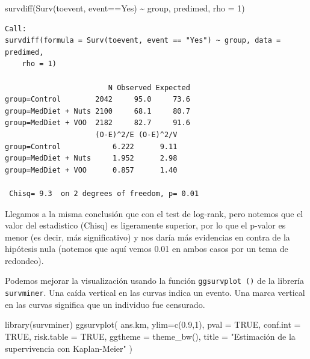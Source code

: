 \documentclass[
]{book}
\newenvironment{Shaded}{\begin{snugshade}}{\end{snugshade}}
\newcommand{\AttributeTok}[1]{\textcolor[rgb]{0.77,0.63,0.00}{#1}}
\newcommand{\ConstantTok}[1]{\textcolor[rgb]{0.00,0.00,0.00}{#1}}
\newcommand{\DecValTok}[1]{\textcolor[rgb]{0.00,0.00,0.81}{#1}}
\newcommand{\FloatTok}[1]{\textcolor[rgb]{0.00,0.00,0.81}{#1}}
\newcommand{\FunctionTok}[1]{\textcolor[rgb]{0.00,0.00,0.00}{#1}}
\newcommand{\NormalTok}[1]{#1}
\newcommand{\SpecialCharTok}[1]{\textcolor[rgb]{0.00,0.00,0.00}{#1}}
\newcommand{\StringTok}[1]{\textcolor[rgb]{0.31,0.60,0.02}{#1}}
\begin{document}
\begin{Shaded}
\begin{Highlighting}[]
\FunctionTok{survdiff}\NormalTok{(}\FunctionTok{Surv}\NormalTok{(toevent, event}\SpecialCharTok{==}\StringTok{\textquotesingle{}Yes\textquotesingle{}}\NormalTok{) }\SpecialCharTok{\textasciitilde{}}\NormalTok{ group, predimed, }\AttributeTok{rho =} \DecValTok{1}\NormalTok{)}
\end{Highlighting}
\end{Shaded}

\begin{verbatim}
Call:
survdiff(formula = Surv(toevent, event == "Yes") ~ group, data = predimed, 
    rho = 1)

                        N Observed Expected
group=Control        2042     95.0     73.6
group=MedDiet + Nuts 2100     68.1     80.7
group=MedDiet + VOO  2182     82.7     91.6
                     (O-E)^2/E (O-E)^2/V
group=Control            6.222      9.11
group=MedDiet + Nuts     1.952      2.98
group=MedDiet + VOO      0.857      1.40

 Chisq= 9.3  on 2 degrees of freedom, p= 0.01 
\end{verbatim}

Llegamos a la misma conclusión que con el test de log-rank, pero notemos que el valor del estadistico (Chisq) es ligeramente superior, por lo que el p-valor es menor (es decir, más significativo) y nos daría más evidencias en contra de la hipótesis nula (notemos que aquí vemos 0.01 en ambos casos por un tema de redondeo).

Podemos mejorar la visualización usando la función \texttt{ggsurvplot\ ()} de la librería \texttt{survminer}. Una caída vertical en las curvas indica un evento. Una marca vertical en las curvas significa que un individuo fue censurado.

\begin{Shaded}
\begin{Highlighting}[]
\FunctionTok{library}\NormalTok{(survminer)}
\FunctionTok{ggsurvplot}\NormalTok{(}
\NormalTok{  ans.km, }\AttributeTok{ylim=}\FunctionTok{c}\NormalTok{(}\FloatTok{0.9}\NormalTok{,}\DecValTok{1}\NormalTok{),}
  \AttributeTok{pval =} \ConstantTok{TRUE}\NormalTok{,}
  \AttributeTok{conf.int =} \ConstantTok{TRUE}\NormalTok{,}
  \AttributeTok{risk.table =} \ConstantTok{TRUE}\NormalTok{,}
  \AttributeTok{ggtheme =} \FunctionTok{theme\_bw}\NormalTok{(),}
  \AttributeTok{title =} \StringTok{"Estimación de la supervivencia con Kaplan{-}Meier"}
\NormalTok{)}
\end{Highlighting}
\end{Shaded}
\end{document}
